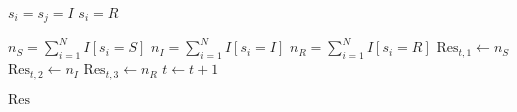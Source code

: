 \documentclass[a4paper]{article}
\begin{document}
\begin{algorithm}
\begin{algorithmic}
\STATE $s_{i} = s_{j} = I$
\ENDIF
\ENDFOR
\ENDFOR
{}
\STATE $s_{i} = R$
\ENDIF
\ENDFOR

\STATE $n_{S} = \sum_{i=1}^{N} I[s_{i} = S]$
\STATE $n_{I} = \sum_{i=1}^{N} I[s_{i} = I]$
\STATE $n_{R} = \sum_{i=1}^{N} I[s_{i} = R]$ 
\STATE $\text{Res}_{t,1} \leftarrow n_{S}$
\STATE $\text{Res}_{t,2} \leftarrow n_{I}$
\STATE $\text{Res}_{t,3} \leftarrow n_{R}$
\STATE $t \leftarrow t + 1 $
\ENDWHILE 

\RETURN $\text{Res}$

\end{algorithmic}
\end{algorithm}
\end{document}
